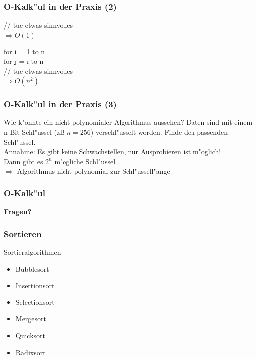\documentclass{beamer}
\begin{document}
\begin{frame}
\frametitle{O-Kalk"ul in der Praxis (2)}
\begin{exampleblock}{}
// tue etwas sinnvolles\\[0.5cm]
\pause
$\Longrightarrow O(1)$
\end{exampleblock}

\pause

\begin{exampleblock}{}
for i = 1 to n\\
	\hspace{1cm} for j = i to n\\
		\hspace{2cm} // tue etwas sinnvolles\\[0.5cm]
\pause
$\Longrightarrow O(n^2)$
\end{exampleblock}
\end{frame}


\begin{frame}
\frametitle{O-Kalk"ul in der Praxis (3)}
\begin{exampleblock}{Wie k"onnte ein nicht-polynomialer Algorithmus aussehen?}
Daten sind mit einem n-Bit Schl"ussel (zB $n = 256$) verschl"usselt worden. Finde den passenden Schl"ussel.\\[0.5cm]
Annahme: Es gibt keine Schwachstellen, nur Ausprobieren ist m"oglich!\\[0.5cm]
\pause
Dann gibt es $2^n$ m"ogliche Schl"ussel\\
$\Longrightarrow$ Algorithmus nicht polynomial zur Schl"ussell"ange
\end{exampleblock}
\end{frame}


\begin{frame}
\frametitle{O-Kalk"ul}
\begin{center}
\textbf{\Huge Fragen?}
\end{center}
\end{frame}


\begin{frame}
\frametitle{Sortieren}
\begin{block}{Sortieralgorithmen}
\begin{itemize}
\item Bubblesort
\item Insertionsort
\item Selectionsort
\item Mergesort
\item Quicksort
\item Radixsort
\end{itemize}
\end{block}
\end{frame}
\end{document}
